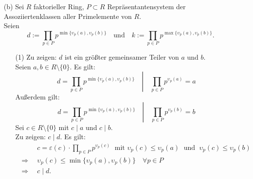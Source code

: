 \documentclass[12pt]{article}
\newcommand{\df}{\enspace\Longrightarrow\enspace}
\begin{document}
\begin{enumerate}
	\item[(b)] Sei $R$ faktorieller Ring, $P\subset R$ Repräsentantensystem der Assoziiertenklassen aller Primelemente von $R$. \\
	Seien $$d:=\prod_{p\in P}p^{\min\{\upsilon_p(a),\upsilon_p(b)\}}\quad\text{und}\quad k:=\prod_{p\in P}p^{\max\{\upsilon_p(a),\upsilon_p(b)\}}.$$
	\begin{enumerate}
		\item[(1)] Zu zeigen: $d$ ist ein größter gemeinsamer Teiler von $a$ und $b$. \\
		Seien $a,b\in R\setminus\{0\}$. Es gilt:
		$$d=\left.\prod_{p\in P}p^{\min\{\upsilon_p(a),\upsilon_p(b)\}} \quad\right\vert\quad \prod_{p\in P}p^{\upsilon_p(a)}=a$$
		Außerdem gilt:
		$$d=\left.\prod_{p\in P}p^{\min\{\upsilon_p(a),\upsilon_p(b)\}} \quad\right\vert\quad \prod_{p\in P}p^{\upsilon_p(b)}=b$$
		Sei $c\in R\setminus\{0\}$ mit $c\mid a$ und $c\mid b$. \\
		Zu zeigen: $c\mid d$. Es gilt:
		\begin{align*}
			&c=\varepsilon(c)\cdot\prod_{p\in P}p^{\upsilon_p(c)}\;\text{ mit }\upsilon_p(c)\leq\upsilon_p(a)\;\text{ und }\;\upsilon_p(c)\leq\upsilon_p(b) \\
			\df &\upsilon_p(c)\leq\min\{\upsilon_p(a),\upsilon_p(b)\}\quad\forall p\in P \\
			\df &c\mid d.
		\end{align*}
		

\end{enumerate}
\end{enumerate}
\end{document}

